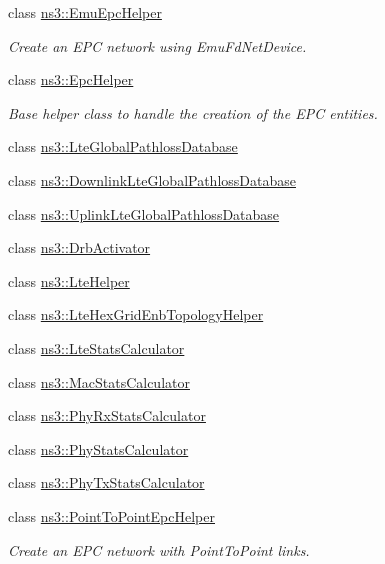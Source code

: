 \begin{DoxyCompactItemize}
\item 
class \hyperlink{classns3_1_1EmuEpcHelper}{ns3\+::\+Emu\+Epc\+Helper}
\begin{DoxyCompactList}\small\item\em Create an E\+PC network using Emu\+Fd\+Net\+Device. \end{DoxyCompactList}\item 
class \hyperlink{classns3_1_1EpcHelper}{ns3\+::\+Epc\+Helper}
\begin{DoxyCompactList}\small\item\em Base helper class to handle the creation of the E\+PC entities. \end{DoxyCompactList}\item 
class \hyperlink{classns3_1_1LteGlobalPathlossDatabase}{ns3\+::\+Lte\+Global\+Pathloss\+Database}
\item 
class \hyperlink{classns3_1_1DownlinkLteGlobalPathlossDatabase}{ns3\+::\+Downlink\+Lte\+Global\+Pathloss\+Database}
\item 
class \hyperlink{classns3_1_1UplinkLteGlobalPathlossDatabase}{ns3\+::\+Uplink\+Lte\+Global\+Pathloss\+Database}
\item 
class \hyperlink{classns3_1_1DrbActivator}{ns3\+::\+Drb\+Activator}
\item 
class \hyperlink{classns3_1_1LteHelper}{ns3\+::\+Lte\+Helper}
\item 
class \hyperlink{classns3_1_1LteHexGridEnbTopologyHelper}{ns3\+::\+Lte\+Hex\+Grid\+Enb\+Topology\+Helper}
\item 
class \hyperlink{classns3_1_1LteStatsCalculator}{ns3\+::\+Lte\+Stats\+Calculator}
\item 
class \hyperlink{classns3_1_1MacStatsCalculator}{ns3\+::\+Mac\+Stats\+Calculator}
\item 
class \hyperlink{classns3_1_1PhyRxStatsCalculator}{ns3\+::\+Phy\+Rx\+Stats\+Calculator}
\item 
class \hyperlink{classns3_1_1PhyStatsCalculator}{ns3\+::\+Phy\+Stats\+Calculator}
\item 
class \hyperlink{classns3_1_1PhyTxStatsCalculator}{ns3\+::\+Phy\+Tx\+Stats\+Calculator}
\item 
class \hyperlink{classns3_1_1PointToPointEpcHelper}{ns3\+::\+Point\+To\+Point\+Epc\+Helper}
\begin{DoxyCompactList}\small\item\em Create an E\+PC network with Point\+To\+Point links. \end{DoxyCompactList}\item 

\end{DoxyCompactItemize}
